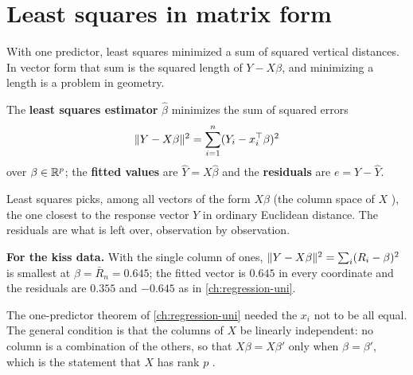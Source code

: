 \section{Least squares in matrix form}
\label{sec:mreg-lse}

With one predictor, least squares minimized a sum of squared vertical distances.
In vector form that sum is the squared length of $Y - X\beta$, and minimizing a length is a problem in geometry.

\begin{definition}
\label{def:mreg-lse}
The \textbf{least squares estimator} $\hat{\beta}$ minimizes the sum of squared errors
\[
\lVert Y - X\beta\rVert^2 = \sum_{i=1}^n (Y_i - x_i^\top\beta)^2
\]
over $\beta \in \mathbb{R}^p$; the \textbf{fitted values} are $\hat{Y} = X\hat{\beta}$ and the \textbf{residuals} are $e = Y - \hat{Y}$.
\end{definition}

\begin{inwords}
Least squares picks, among all vectors of the form $X\beta$ (the column space of $X$ ), the one closest to the response vector $Y$ in ordinary Euclidean distance. The residuals are what is left over, observation by observation.

\textbf{For the kiss data.} With the single column of ones, $\lVert Y - X\beta\rVert^2 = \sum_i (R_i - \beta)^2$ is smallest at $\beta = \bar{R}_n = 0.645$; the fitted vector is $0.645$ in every coordinate and the residuals are $0.355$ and $-0.645$ as in \cref{ch:regression-uni}.
\end{inwords}

The one-predictor theorem of \cref{ch:regression-uni} needed the $x_i$ not to be all equal.
The general condition is that the columns of $X$ be linearly independent: no column is a combination of the others, so that $X\beta = X\beta'$ only when $\beta = \beta'$, which is the statement that $X$ has rank $p$ .

